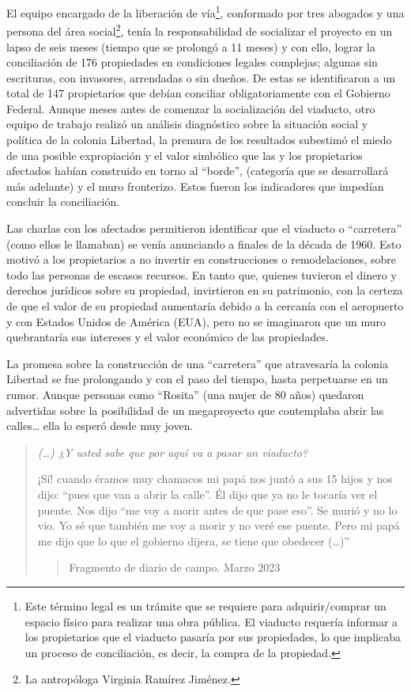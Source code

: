 \documentclass[
  spanish,
  11pt,
  a4paper,
]{scrbook}
\begin{document}
El equipo encargado de la liberación de vía\footnote{Este término legal
  es un trámite que se requiere para adquirir/comprar un espacio físico
  para realizar una obra pública. El viaducto requería informar a los
  propietarios que el viaducto pasaría por sus propiedades, lo que
  implicaba un proceso de conciliación, es decir, la compra de la
  propiedad.}, conformado por tres abogados y una persona del área
social\footnote{La antropóloga Virginia Ramírez Jiménez.}, tenía la
responsabilidad de socializar el proyecto en un lapso de seis meses
(tiempo que se prolongó a 11 meses) y con ello, lograr la conciliación
de 176 propiedades en condiciones legales complejas; algunas sin
escrituras, con invasores, arrendadas o sin dueños. De estas se
identificaron a un total de 147 propietarios que debían conciliar
obligatoriamente con el Gobierno Federal. Aunque meses antes de comenzar
la socialización del viaducto, otro equipo de trabajo realizó un
análisis diagnóstico sobre la situación social y política de la colonia
Libertad, la premura de los resultados subestimó el miedo de una posible
expropiación y el valor simbólico que las y los propietarios afectados
habían construido en torno al ``borde'', (categoría que se desarrollará
más adelante) y el muro fronterizo. Estos fueron los indicadores que
impedían concluir la conciliación.

Las charlas con los afectados permitieron identificar que el viaducto o
``carretera'' (como ellos le llamaban) se venía anunciando a finales de
la década de 1960. Esto motivó a los propietarios a no invertir en
construcciones o remodelaciones, sobre todo las personas de escasos
recursos. En tanto que, quienes tuvieron el dinero y derechos jurídicos
sobre su propiedad, invirtieron en su patrimonio, con la certeza de que
el valor de su propiedad aumentaría debido a la cercanía con el
aeropuerto y con Estados Unidos de América (EUA), pero no se imaginaron
que un muro quebrantaría sus intereses y el valor económico de las
propiedades.

La promesa sobre la construcción de una ``carretera'' que atravesaría la
colonia Libertad se fue prolongando y con el paso del tiempo, hasta
perpetuarse en un rumor. Aunque personas como ``Rosita'' (una mujer de
80 años) quedaron advertidas sobre la posibilidad de un megaproyecto que
contemplaba abrir las calles\ldots{} ella lo esperó desde muy joven.

\begin{quote}
\emph{(\ldots) ¿Y usted sabe que por aquí va a pasar un viaducto?}

¡Sí! cuando éramos muy chamacos mi papá nos juntó a sus 15 hijos y nos
dijo: ``pues que van a abrir la calle''. Él dijo que ya no le tocaría
ver el puente. Nos dijo ``me voy a morir antes de que pase eso''. Se
murió y no lo vio. Yo sé que también me voy a morir y no veré ese
puente. Pero mi papá me dijo que lo que el gobierno dijera, se tiene que
obedecer (\ldots)''

\begin{quote}
Fragmento de diario de campo. Marzo 2023
\end{quote}
\end{quote}
\end{document}
